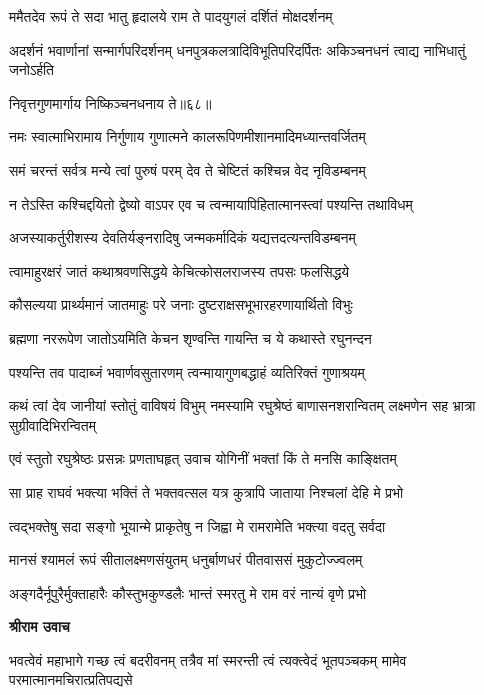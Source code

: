 \twolineshloka
{ममैतदेव रूपं ते सदा भातु हृदालये}
{राम ते पादयुगलं दर्शितं मोक्षदर्शनम्} %

\threelineshloka
{अदर्शनं भवार्णानां सन्मार्गपरिदर्शनम्}
{धनपुत्रकलत्रादिविभूतिपरिदर्पितः}
{अकिञ्चनधनं त्वाद्य नाभिधातुं जनोऽर्हति} %

{निवृत्तगुणमार्गाय निष्किञ्चनधनाय ते॥६८॥} %


\twolineshloka
{नमः स्वात्माभिरामाय निर्गुणाय गुणात्मने}
{कालरूपिणमीशानमादिमध्यान्तवर्जितम्} %

\twolineshloka
{समं चरन्तं सर्वत्र मन्ये त्वां पुरुषं परम्}
{देव ते चेष्टितं कश्चिन्न वेद नृविडम्बनम्} %

\twolineshloka
{न तेऽस्ति कश्चिद्दयितो द्वेष्यो वाऽपर एव च}
{त्वन्मायापिहितात्मानस्त्वां पश्यन्ति तथाविधम्} %

\twolineshloka
{अजस्याकर्तुरीशस्य देवतिर्यङ्नरादिषु}
{जन्मकर्मादिकं यद्यत्तदत्यन्तविडम्बनम्} %

\twolineshloka
{त्वामाहुरक्षरं जातं कथाश्रवणसिद्धये}
{केचित्कोसलराजस्य तपसः फलसिद्धये} %

\twolineshloka
{कौसल्यया प्रार्थ्यमानं जातमाहुः परे जनाः}
{दुष्टराक्षसभूभारहरणायार्थितो विभुः} %

\twolineshloka
{ब्रह्मणा नररूपेण जातोऽयमिति केचन}
{शृण्वन्ति गायन्ति च ये कथास्ते रघुनन्दन} %

\twolineshloka
{पश्यन्ति तव पादाब्जं भवार्णवसुतारणम्}
{त्वन्मायागुणबद्धाहं व्यतिरिक्तं गुणाश्रयम्} %

\threelineshloka
{कथं त्वां देव जानीयां स्तोतुं वाविषयं विभुम्}
{नमस्यामि रघुश्रेष्ठं बाणासनशरान्वितम्}
{लक्ष्मणेन सह भ्रात्रा सुग्रीवादिभिरन्वितम्} %

\twolineshloka
{एवं स्तुतो रघुश्रेष्ठः प्रसन्नः प्रणताघहृत्}
{उवाच योगिनीं भक्तां किं ते मनसि काङ्क्षितम्} %

\twolineshloka
{सा प्राह राघवं भक्त्या भक्तिं ते भक्तवत्सल}
{यत्र कुत्रापि जाताया निश्चलां देहि मे प्रभो} %

\twolineshloka
{त्वद्भक्तेषु सदा सङ्गो भूयान्मे प्राकृतेषु न}
{जिह्वा मे रामरामेति भक्त्या वदतु सर्वदा} %

\twolineshloka
{मानसं श्यामलं रूपं सीतालक्ष्मणसंयुतम्}
{धनुर्बाणधरं पीतवाससं मुकुटोज्ज्वलम्} %

\twolineshloka
{अङ्गदैर्नूपुरैर्मुक्ताहारैः कौस्तुभकुण्डलैः}
{भान्तं स्मरतु मे राम वरं नान्यं वृणे प्रभो} %

\textbf{श्रीराम उवाच}

\threelineshloka
{भवत्वेवं महाभागे गच्छ त्वं बदरीवनम्}
{तत्रैव मां स्मरन्ती त्वं त्यक्त्वेदं भूतपञ्चकम्}
{मामेव परमात्मानमचिरात्प्रतिपद्यसे} %

